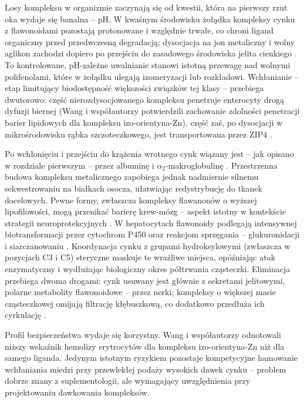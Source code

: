 \documentclass[12pt,a4paper]{article}
\begin{document}
Losy kompleksu w organizmie zaczynają się od kwestii, która na pierwszy rzut oka wydaje się banalna -- pH. W kwaśnym środowisku żołądka kompleksy cynku z flawonoidami pozostają protonowane i względnie trwałe, co chroni ligand organiczny przed przedwczesną degradacją; dysocjacja na jon metaliczny i wolny aglikon zachodzi dopiero po przejściu do zasadowego środowiska jelita cienkiego \cite{maares2020}. To kontrolowane, pH-zależne uwalnianie stanowi istotną przewagę nad wolnymi polifenolami, które w żołądku ulegają izomeryzacji lub rozkładowi. Wchłanianie -- etap limitujący biodostępność większości związków tej klasy -- przebiega dwutorowo: część nierozdysocjowanego kompleksu penetruje enterocyty drogą dyfuzji biernej (Wang i współautorzy \cite{wang2021} potwierdzili zachowanie zdolności penetracji barier lipidowych dla kompleksu izo-orientyna-Zn), część zaś, po dysocjacji w mikrośrodowisku rąbka szczoteczkowego, jest transportowana przez ZIP4 \cite{stiles2024, hara2017}.

Po wchłonięciu i przejściu do krążenia wrotnego cynk wiązany jest -- jak opisano w rozdziale pierwszym -- przez albuminę i \(\alpha_2\)-makroglobulinę \cite{stiles2024}. Przestrzenna budowa kompleksu metalicznego zapobiega jednak nadmiernie silnemu sekwestrowaniu na białkach osocza, ułatwiając redystrybucję do tkanek docelowych. Pewne formy, zwłaszcza kompleksy flawanonów o wyższej lipofilowości, mogą przenikać barierę krew-mózg -- aspekt istotny w kontekście strategii neuroprotekcyjnych \cite{najmanova2019}. W hepatocytach flawonoidy podlegają intensywnej biotransformacji przez cytochrom P450 oraz reakcjom sprzęgania -- glukuronidacji i siarczanowaniu \cite{yang2022}. Koordynacja cynku z grupami hydroksylowymi (zwłaszcza w pozycjach C3 i C5) steryczne maskuje te wrażliwe miejsca, opóźniając atak enzymatyczny i wydłużając biologiczny okres półtrwania cząsteczki. Eliminacja przebiega dwoma drogami: cynk usuwany jest głównie z sekretami jelitowymi, polarne metabolity flawonoidowe -- przez nerki; kompleksy o większej masie cząsteczkowej omijają filtrację kłębuszkową, co dodatkowo przedłuża ich cyrkulację \cite{stiles2024, najmanova2019}.

Profil bezpieczeństwa wydaje się korzystny. Wang i współautorzy \cite{wang2021} odnotowali niższy wskaźnik hemolizy erytrocytów dla kompleksu izo-orientyna-Zn niż dla samego liganda. Jedynym istotnym ryzykiem pozostaje kompetycyjne hamowanie wchłaniania miedzi przy przewlekłej podaży wysokich dawek cynku -- problem dobrze znany z suplementologii, ale wymagający uwzględnienia przy projektowaniu dawkowania kompleksów.
\end{document}
